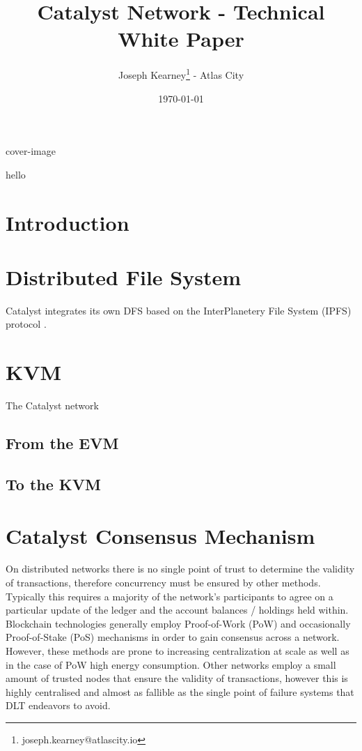 \documentclass{article}
\title{\textbf{Catalyst Network - Technical White Paper}}
\date{\today}
\author{Joseph Kearney\thanks{joseph.kearney@atlascity.io} - Atlas City}
\begin{document}
 {cover-image}

\maketitle

\abstract 

hello

\newpage

\tableofcontents

\newpage

\section*{Introduction}

\section{Distributed File System}

Catalyst integrates its own DFS based on the InterPlanetery File System (IPFS) protocol \cite{benet2014ipfs}.

\section{KVM}

The Catalyst network 

\subsection{From the EVM}

\subsection{To the KVM}



\section{Catalyst Consensus Mechanism} 

On distributed networks there is no single point of trust to determine the validity of transactions, therefore concurrency must be ensured by other methods. Typically this requires a majority of the network's participants to agree on a particular update of the ledger and the account balances / holdings held within. Blockchain technologies generally employ Proof-of-Work (PoW) and occasionally Proof-of-Stake (PoS) mechanisms in order to gain consensus across a network. However, these methods are prone to increasing centralization at scale as well as in the case of PoW high energy consumption. Other networks employ a small amount of trusted nodes that ensure the validity of transactions, however this is highly centralised and almost as fallible as the single point of failure systems that DLT endeavors to avoid. \\
\end{document}
